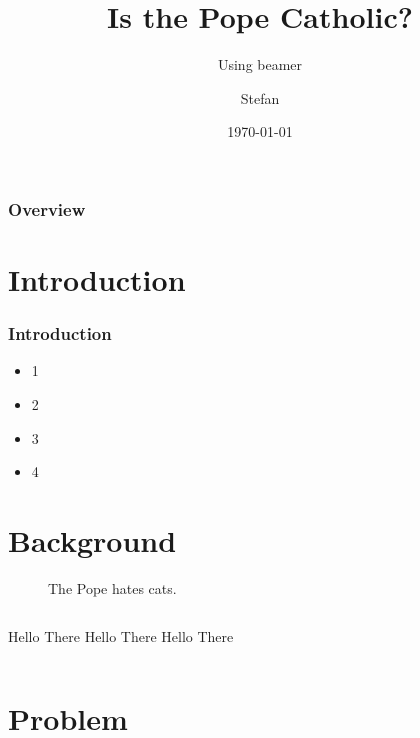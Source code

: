 \documentclass{beamer}
\title{Is the Pope Catholic?}
\subtitle{Using beamer}
\author{Stefan}
\institute{University}
\date{\today}
\begin{document}
\begin{frame}
	\titlepage
\end{frame}

\begin{frame}
	\frametitle{Overview}
	\tableofcontents
\end{frame}


\section{Introduction}
\begin{frame}
	\frametitle{Introduction}
	\begin{itemize}
		\pause
		\item 1
		\pause
		\item 2
		\pause
		\item 3
		\pause
		\item 4

	\end{itemize}
\end{frame}


\section{Background}
\begin{frame}
	\begin{figure}
	The Pope hates cats.
	\end{figure}

\end{frame}
	\begin{frame}
		\begin{columns}
				Hello There
				Hello There
				Hello There

				
		\end{columns}
	\end{frame}


\section{Problem}
\begin{frame}
\end{frame}


\end{document}
